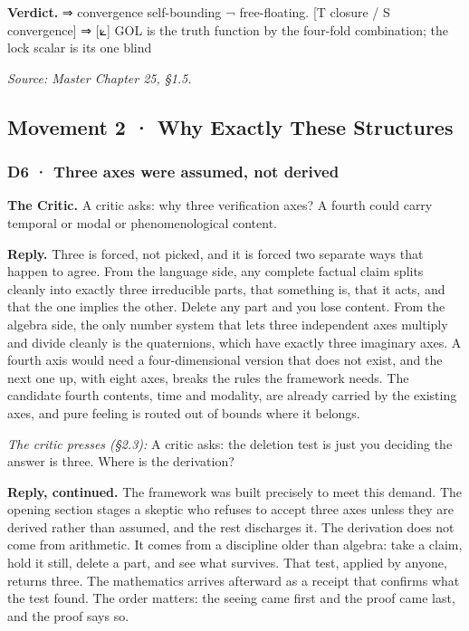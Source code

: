 \documentclass[10pt,twocolumn]{article}
\begin{document}
\textbf{Verdict.} ⇒ convergence self-bounding ¬ free-floating. {[}T
closure / S convergence{]} ⇒ {[}⟀{]} GOL is the truth function by the
four-fold combination; the lock scalar is its one blind

\emph{Source: Master Chapter 25, §1.5.}

\hypertarget{movement-2-why-exactly-these-structures}{%
\subsection{Movement 2 · Why Exactly These
Structures}\label{movement-2-why-exactly-these-structures}}

\hypertarget{d6-three-axes-were-assumed-not-derived}{%
\subsubsection{D6 · Three axes were assumed, not
derived}\label{d6-three-axes-were-assumed-not-derived}}

\textbf{The Critic.} A critic asks: why three verification axes? A
fourth could carry temporal or modal or phenomenological content.

\textbf{Reply.} Three is forced, not picked, and it is forced two
separate ways that happen to agree. From the language side, any complete
factual claim splits cleanly into exactly three irreducible parts, that
something is, that it acts, and that the one implies the other. Delete
any part and you lose content. From the algebra side, the only number
system that lets three independent axes multiply and divide cleanly is
the quaternions, which have exactly three imaginary axes. A fourth axis
would need a four-dimensional version that does not exist, and the next
one up, with eight axes, breaks the rules the framework needs. The
candidate fourth contents, time and modality, are already carried by the
existing axes, and pure feeling is routed out of bounds where it
belongs.

\emph{The critic presses (§2.3):} A critic asks: the deletion test is
just you deciding the answer is three. Where is the derivation?

\textbf{Reply, continued.} The framework was built precisely to meet
this demand. The opening section stages a skeptic who refuses to accept
three axes unless they are derived rather than assumed, and the rest
discharges it. The derivation does not come from arithmetic. It comes
from a discipline older than algebra: take a claim, hold it still,
delete a part, and see what survives. That test, applied by anyone,
returns three. The mathematics arrives afterward as a receipt that
confirms what the test found. The order matters: the seeing came first
and the proof came last, and the proof says so.
\end{document}
